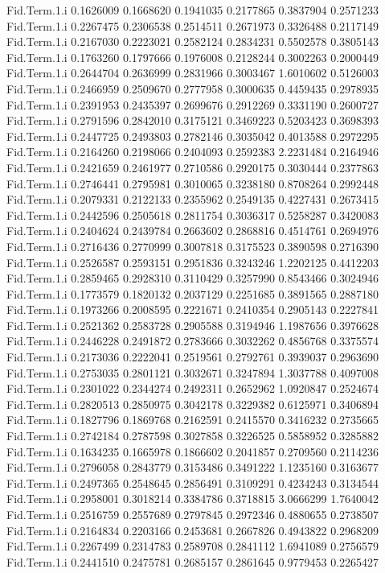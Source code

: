 \documentclass[11pt]{article} %
\begin{document}
\begin{Schunk}
\begin{Soutput}
Fid.Term.1.i 0.1626009 0.1668620 0.1941035 0.2177865 0.3837904 0.2571233
Fid.Term.1.i 0.2267475 0.2306538 0.2514511 0.2671973 0.3326488 0.2117149
Fid.Term.1.i 0.2167030 0.2223021 0.2582124 0.2834231 0.5502578 0.3805143
Fid.Term.1.i 0.1763260 0.1797666 0.1976008 0.2128244 0.3002263 0.2000449
Fid.Term.1.i 0.2644704 0.2636999 0.2831966 0.3003467 1.6010602 0.5126003
Fid.Term.1.i 0.2466959 0.2509670 0.2777958 0.3000635 0.4459435 0.2978935
Fid.Term.1.i 0.2391953 0.2435397 0.2699676 0.2912269 0.3331190 0.2600727
Fid.Term.1.i 0.2791596 0.2842010 0.3175121 0.3469223 0.5203423 0.3698393
Fid.Term.1.i 0.2447725 0.2493803 0.2782146 0.3035042 0.4013588 0.2972295
Fid.Term.1.i 0.2164260 0.2198066 0.2404093 0.2592383 2.2231484 0.2164946
Fid.Term.1.i 0.2421659 0.2461977 0.2710586 0.2920175 0.3030444 0.2377863
Fid.Term.1.i 0.2746441 0.2795981 0.3010065 0.3238180 0.8708264 0.2992448
Fid.Term.1.i 0.2079331 0.2122133 0.2355962 0.2549135 0.4227431 0.2673415
Fid.Term.1.i 0.2442596 0.2505618 0.2811754 0.3036317 0.5258287 0.3420083
Fid.Term.1.i 0.2404624 0.2439784 0.2663602 0.2868816 0.4514761 0.2694976
Fid.Term.1.i 0.2716436 0.2770999 0.3007818 0.3175523 0.3890598 0.2716390
Fid.Term.1.i 0.2526587 0.2593151 0.2951836 0.3243246 1.2202125 0.4412203
Fid.Term.1.i 0.2859465 0.2928310 0.3110429 0.3257990 0.8543466 0.3024946
Fid.Term.1.i 0.1773579 0.1820132 0.2037129 0.2251685 0.3891565 0.2887180
Fid.Term.1.i 0.1973266 0.2008595 0.2221671 0.2410354 0.2905143 0.2227841
Fid.Term.1.i 0.2521362 0.2583728 0.2905588 0.3194946 1.1987656 0.3976628
Fid.Term.1.i 0.2446228 0.2491872 0.2783666 0.3032262 0.4856768 0.3375574
Fid.Term.1.i 0.2173036 0.2222041 0.2519561 0.2792761 0.3939037 0.2963690
Fid.Term.1.i 0.2753035 0.2801121 0.3032671 0.3247894 1.3037788 0.4097008
Fid.Term.1.i 0.2301022 0.2344274 0.2492311 0.2652962 1.0920847 0.2524674
Fid.Term.1.i 0.2820513 0.2850975 0.3042178 0.3229382 0.6125971 0.3406894
Fid.Term.1.i 0.1827796 0.1869768 0.2162591 0.2415570 0.3416232 0.2735665
Fid.Term.1.i 0.2742184 0.2787598 0.3027858 0.3226525 0.5858952 0.3285882
Fid.Term.1.i 0.1634235 0.1665978 0.1866602 0.2041857 0.2709560 0.2114236
Fid.Term.1.i 0.2796058 0.2843779 0.3153486 0.3491222 1.1235160 0.3163677
Fid.Term.1.i 0.2497365 0.2548645 0.2856491 0.3109291 0.4234243 0.3134544
Fid.Term.1.i 0.2958001 0.3018214 0.3384786 0.3718815 3.0666299 1.7640042
Fid.Term.1.i 0.2516759 0.2557689 0.2797845 0.2972346 0.4880655 0.2738507
Fid.Term.1.i 0.2164834 0.2203166 0.2453681 0.2667826 0.4943822 0.2968209
Fid.Term.1.i 0.2267499 0.2314783 0.2589708 0.2841112 1.6941089 0.2756579
Fid.Term.1.i 0.2441510 0.2475781 0.2685157 0.2861645 0.9779453 0.2265427

\end{Soutput}
\end{Schunk}
\end{document}
